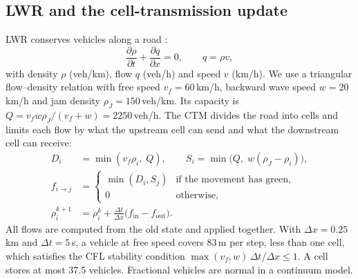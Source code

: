 \documentclass[conference]{IEEEtran}
\begin{document}
\subsection{LWR and the cell-transmission update}
LWR conserves vehicles along a road \cite{lw,richards}:
\begin{equation}
\frac{\partial\rho}{\partial t}+\frac{\partial q}{\partial x}=0,\qquad q=\rho v,
\end{equation}
with density $\rho$ (veh/km), flow $q$ (veh/h) and speed $v$ (km/h). We use a triangular flow--density relation with free speed $v_f=60$\,km/h, backward wave speed $w=20$\,km/h and jam density $\rho_J=150$\,veh/km. Its capacity is $Q=v_f w\rho_J/(v_f+w)=2250$\,veh/h. The CTM \cite{ctm1,ctmoverview} divides the road into cells and limits each flow by what the upstream cell can send and what the downstream cell can receive:
\begin{align}
D_i&=\min(v_f\rho_i,\;Q),\qquad S_i=\min\bigl(Q,\;w(\rho_J-\rho_i)\bigr),\\
f_{i\to j}&=\begin{cases}\min(D_i,S_j)&\text{if the movement has green,}\\0&\text{otherwise,}\end{cases}\\
\rho_i^{k+1}&=\rho_i^{k}+\frac{\Delta t}{\Delta x}\bigl(f_{\mathrm{in}}-f_{\mathrm{out}}\bigr).
\end{align}
All flows are computed from the old state and applied together. With $\Delta x=0.25$\,km and $\Delta t=5$\,s, a vehicle at free speed covers 83\,m per step, less than one cell, which satisfies the CFL stability condition $\max(v_f,w)\,\Delta t/\Delta x\le1$. A cell stores at most 37.5 vehicles. Fractional vehicles are normal in a continuum model.
\end{document}
